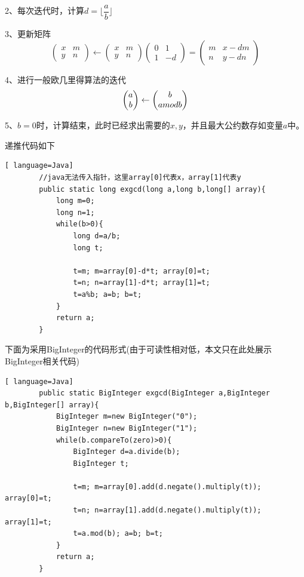 \documentclass[UTF8,a4paper,11pt]{ctexart}
\begin{document}
	\par 2、每次迭代时，计算$d=\lfloor\dfrac{a}{b}\rfloor$

	\par 3、更新矩阵
	   $$
	   \left(\begin{matrix}x & m\\y & n\end{matrix}\right) \leftarrow
	   \left(\begin{matrix}x & m\\y & n\end{matrix}\right) \left(\begin{matrix}0 & 1\\1 & -d\end{matrix}\right) =
	   \left(\begin{matrix}m & x-dm\\n & y-dn\end{matrix}\right)
	   $$

	\par 4、进行一般欧几里得算法的迭代
	   $$
	   \left(\begin{matrix}a\\b\end{matrix}\right) \leftarrow
	   \left(\begin{matrix}b\\a\space mod \space b\end{matrix}\right)
	   $$

	\par 5、$b=0$时，计算结束，此时已经求出需要的$x,y$，并且最大公约数存如变量$a$中。
	\par 递推代码如下
	\begin{lstlisting}[ language=Java]
		//java无法传入指针，这里array[0]代表x，array[1]代表y
		public static long exgcd(long a,long b,long[] array){
		    long m=0;
		    long n=1;
		    while(b>0){
		        long d=a/b;
		        long t;
		        
		        t=m; m=array[0]-d*t; array[0]=t;
		        t=n; n=array[1]-d*t; array[1]=t;
		        t=a%b; a=b; b=t;
		    }
		    return a;
		}
	\end{lstlisting}
	
	\par 下面为采用BigInteger的代码形式(由于可读性相对低，本文只在此处展示BigInteger相关代码)
	\begin{lstlisting}[ language=Java]
		public static BigInteger exgcd(BigInteger a,BigInteger b,BigInteger[] array){
		    BigInteger m=new BigInteger("0");
		    BigInteger n=new BigInteger("1");
			while(b.compareTo(zero)>0){
		        BigInteger d=a.divide(b); 
		        BigInteger t;
		
		        t=m; m=array[0].add(d.negate().multiply(t)); array[0]=t;
		        t=n; n=array[1].add(d.negate().multiply(t)); array[1]=t;
		        t=a.mod(b); a=b; b=t;
		    }
		    return a;
		}
	\end{lstlisting}
\end{document}
